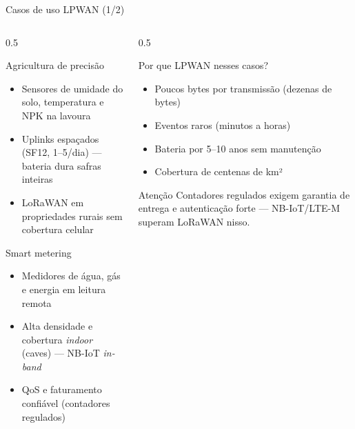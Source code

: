 \documentclass[aspectratio=169,11pt]{beamer}
\begin{document}
\begin{frame}{Casos de uso LPWAN (1/2)}
  \footnotesize
  \begin{columns}[t]
    \begin{column}{0.5\textwidth}
      \begin{block}{Agricultura de precisão}
        \begin{itemize}
          \item Sensores de umidade do solo, temperatura e NPK na lavoura
          \item Uplinks espaçados (SF12, 1--5/dia) --- bateria dura safras inteiras
          \item LoRaWAN em propriedades rurais sem cobertura celular
        \end{itemize}
      \end{block}
      \begin{block}{Smart metering}
        \begin{itemize}
          \item Medidores de água, gás e energia em leitura remota
          \item Alta densidade e cobertura \emph{indoor} (caves) --- NB-IoT \emph{in-band}
          \item QoS e faturamento confiável (contadores regulados)
        \end{itemize}
      \end{block}
    \end{column}
    \begin{column}{0.5\textwidth}
      \begin{exampleblock}{Por que LPWAN nesses casos?}
        \begin{itemize}
          \item Poucos bytes por transmissão (dezenas de bytes)
          \item Eventos raros (minutos a horas)
          \item Bateria por 5--10 anos sem manutenção
          \item Cobertura de centenas de km²
        \end{itemize}
      \end{exampleblock}
      \pause
      \begin{alertblock}{Atenção}
        Contadores regulados exigem garantia de entrega e autenticação forte --- NB-IoT/LTE-M superam LoRaWAN nisso.
      \end{alertblock}
    \end{column}
  \end{columns}
\end{frame}
\end{document}
